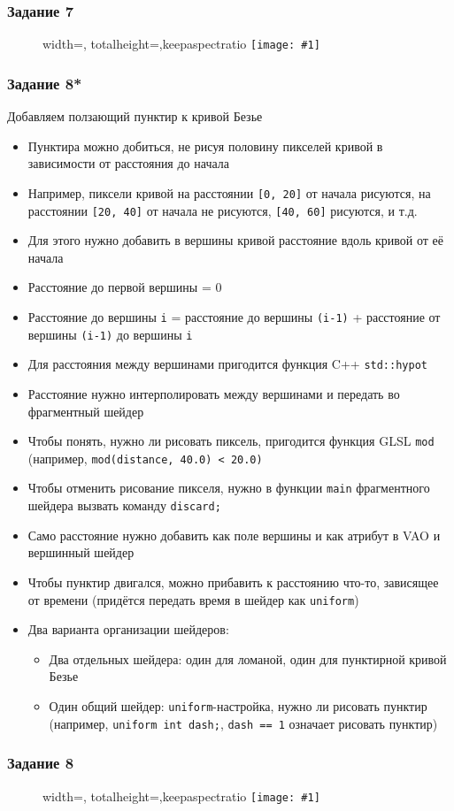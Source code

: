 \documentclass{beamer}
\newcommand{\slideimage}[1]{
  \begin{figure}
    \begin{adjustbox}{width=\textwidth, totalheight=\textheight-2\baselineskip-2\baselineskip,keepaspectratio}
      \texttt{[image: \#1]}
    \end{adjustbox}
  \end{figure}
}
\begin{document}
\begin{frame}
\frametitle{Задание 7}
\slideimage{7.png}
\end{frame}

\begin{frame}[fragile]
\frametitle{Задание 8*}
\fontsize{8pt}{8pt}\selectfont
Добавляем ползающий пунктир к кривой Безье
\begin{itemize}
\item Пунктира можно добиться, не рисуя половину пикселей кривой в зависимости от расстояния до начала
\item Например, пиксели кривой на расстоянии \verb|[0, 20]| от начала рисуются, на расстоянии \verb|[20, 40]| от начала не рисуются, \verb|[40, 60]| рисуются, и т.д.
\item Для этого нужно добавить в вершины кривой расстояние вдоль кривой от её начала
\item Расстояние до первой вершины = 0
\item Расстояние до  вершины \verb|i| = расстояние до  вершины \verb|(i-1)| + расстояние от вершины \verb|(i-1)| до вершины \verb|i|
\item Для расстояния между вершинами пригодится функция C++ \verb|std::hypot|
\item Расстояние нужно интерполировать между вершинами и передать во фрагментный шейдер
\item Чтобы понять, нужно ли рисовать пиксель, пригодится функция GLSL \verb|mod| (например, \verb|mod(distance, 40.0) < 20.0)|
\item Чтобы отменить рисование пикселя, нужно в функции \verb|main| фрагментного шейдера вызвать команду \verb|discard;|
\item Само расстояние нужно добавить как поле вершины и как атрибут в VAO и вершинный шейдер
\item Чтобы пунктир двигался, можно прибавить к расстоянию что-то, зависящее от времени (придётся передать время в шейдер как \verb|uniform|)
\item Два варианта организации шейдеров:
\begin{itemize}
\item Два отдельных шейдера: один для ломаной, один для пунктирной кривой Безье
\item Один общий шейдер: \verb|uniform|-настройка, нужно ли рисовать пунктир (например, \verb|uniform int dash;|, \verb|dash == 1| означает рисовать пунктир)
\end{itemize}
\end{itemize}
\end{frame}

\begin{frame}
\frametitle{Задание 8}
\slideimage{8.png}
\end{frame}
\end{document}
